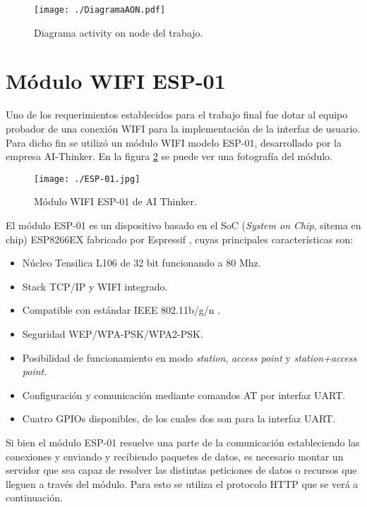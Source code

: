 \begin{figure}[H]
	\centering
	\texttt{[image: ./DiagramaAON.pdf]}
	\caption{Diagrama activity on node del trabajo.}
	\label{fig:AON}
\end{figure}

\section{Módulo WIFI ESP-01}
Uno de los requerimientos establecidos para el trabajo final fue dotar al equipo probador de una conexión WIFI para la implementación de la interfaz de usuario. Para dicho fin se utilizó un módulo WIFI modelo ESP-01, desarrollado por la empresa AI-Thinker. En la figura \ref{fig:ESP01} se puede ver una fotografía del módulo.

\begin{figure}[H]
	\centering
	\texttt{[image: ./ESP-01.jpg]}
	\caption{Módulo WIFI ESP-01 de AI Thinker\protect\footnotemark.}
	\label{fig:ESP01}
\end{figure}


El módulo ESP-01 es un dispositivo basado en el SoC (\emph{System on Chip}, sitema en chip) ESP8266EX fabricado por Espressif \citep{ESP01}, cuyas principales características son:
\begin{itemize}
	\item Núcleo Tensilica L106 de 32 bit funcionando a 80 Mhz.
	\item Stack TCP/IP y WIFI integrado.
	\item Compatible con estándar IEEE 802.11b/g/n .
	\item Seguridad WEP/WPA-PSK/WPA2-PSK.
	\item Posibilidad de funcionamiento en modo \emph{station}, \emph{access point} y \emph{station+access point}.
	\item Configuración y comunicación mediante comandos AT por interfaz UART.
	\item Cuatro GPIOs disponibles, de los cuales dos son para la interfaz UART.

\end{itemize}

Si bien el módulo ESP-01 resuelve una parte de la comunicación estableciendo las conexiones y enviando y recibiendo paquetes de datos, es necesario montar un servidor que sea capaz de resolver las distintas peticiones de datos o recursos que lleguen a través del módulo. Para esto se utiliza el protocolo HTTP que se verá a continuación. 

